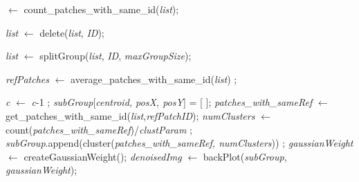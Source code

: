 \documentclass[fleqn,10pt]{wlscirep}
\begin{document}
\begin{algorithm}
\begin{algorithmic}[1]
		 $\gets$ count\_patches\_with\_same\_id(\textit{list});
		
		\State \textit{list} $\gets$ delete(\textit{list}, \textit{ID});
		
		
		\State \textit{list} $\gets$ splitGroup(\textit{list}, \textit{ID}, \textit{maxGroupSize});
		
		
		\EndIf
		
		\EndFor
		
		\State \textit{refPatches} $\gets$ average\_patches\_with\_same\_id(\textit{list}) ;
		
		\State \textit{c} $\gets$ \textit{c}-1 ;
		\EndFor
		\State \textit{subGroup}[\textit{centroid, posX, posY}] = [ ];
		\State \textit{patches\_with\_sameRef} $\gets$ get\_patches\_with\_same\_id(\textit{list},\textit{refPatchID});
		\State \textit{numClusters} $\gets$ count(\textit{patches\_with\_sameRef})/\textit{clustParam} ;
		\State \textit{subGroup}.append(cluster(\textit{patches\_with\_sameRef, numClusters})) ;
		\EndFor
		\State \textit{gaussianWeight} $\gets$ createGaussianWeight();
		\State \textit{denoisedImg} $\gets$ backPlot(\textit{subGroup}, \textit{gaussianWeight});
	\end{algorithmic}
\end{algorithm}

\clearpage

\end{document}
